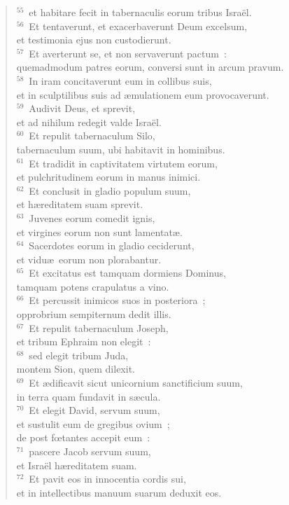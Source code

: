 \begin{flushleft}
\begin{verse}
${}^{55}$~et habitare fecit in tabernaculis eorum tribus Isra\"el.\\
${}^{56}$~Et tentaverunt, et exacerbaverunt Deum excelsum,\\ et testimonia ejus non custodierunt.\\
${}^{57}$~Et averterunt se, et non servaverunt pactum~:\\ quemadmodum patres eorum, conversi sunt in arcum pravum.\\
${}^{58}$~In iram concitaverunt eum in collibus suis,\\ et in sculptilibus suis ad \ae mulationem eum provocaverunt.\\
${}^{59}$~Audivit Deus, et sprevit,\\ et ad nihilum redegit valde Isra\"el.\\
${}^{60}$~Et repulit tabernaculum Silo,\\ tabernaculum suum, ubi habitavit in hominibus.\\
${}^{61}$~Et tradidit in captivitatem virtutem eorum,\\ et pulchritudinem eorum in manus inimici.\\
${}^{62}$~Et conclusit in gladio populum suum,\\ et h\ae reditatem suam sprevit.\\
${}^{63}$~Juvenes eorum comedit ignis,\\ et virgines eorum non sunt lamentat\ae .\\
${}^{64}$~Sacerdotes eorum in gladio ceciderunt,\\ et vidu\ae\ eorum non plorabantur.\\
${}^{65}$~Et excitatus est tamquam dormiens Dominus,\\ tamquam potens crapulatus a vino.\\
${}^{66}$~Et percussit inimicos suos in posteriora~;\\ opprobrium sempiternum dedit illis.\\
${}^{67}$~Et repulit tabernaculum Joseph,\\ et tribum Ephraim non elegit~:\\
${}^{68}$~sed elegit tribum Juda,\\ montem Sion, quem dilexit.\\
${}^{69}$~Et \ae dificavit sicut unicornium sanctificium suum,\\ in terra quam fundavit in s\ae cula.\\
${}^{70}$~Et elegit David, servum suum,\\ et sustulit eum de gregibus ovium~;\\ de post fœtantes accepit eum~:\\
${}^{71}$~pascere Jacob servum suum,\\ et Isra\"el h\ae reditatem suam.\\
${}^{72}$~Et pavit eos in innocentia cordis sui,\\ et in intellectibus manuum suarum deduxit eos.\end{verse}\end{flushleft}


